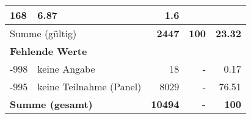 \begin{longtable}{lXrrr}
       \num{168} &
       \num[round-mode=places,round-precision=2]{6,87} &
         \num[round-mode=places,round-precision=2]{1,6} \\
     \midrule
     \multicolumn{2}{l}{Summe (gültig)} &
       \textbf{\num{2447}} &
     \textbf{100} &
       \textbf{\num[round-mode=places,round-precision=2]{23,32}} \\
     \multicolumn{5}{l}{\textbf{Fehlende Werte}}\\
       -998 &
       keine Angabe &
         \num{18} &
        - &
         \num[round-mode=places,round-precision=2]{0,17} \\
       -995 &
       keine Teilnahme (Panel) &
         \num{8029} &
        - &
         \num[round-mode=places,round-precision=2]{76,51} \\
     \midrule
     \multicolumn{2}{l}{\textbf{Summe (gesamt)}} &
          \textbf{\num{10494}} &
        \textbf{-} &
        \textbf{100} \\
     \bottomrule
     \end{longtable}
     
